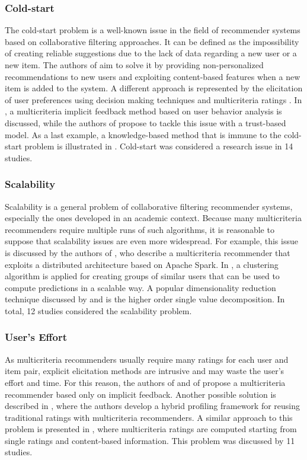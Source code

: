 \subsubsection{Cold-start}
The cold-start problem is a well-known issue in the field of recommender systems based on collaborative filtering approaches. It can be defined as the impossibility of creating reliable suggestions due to the lack of data regarding a new user or a new item. The authors of  aim to solve it by providing non-personalized recommendations to new users and exploiting content-based features when a new item is added to the system. A different approach is represented by the elicitation of user preferences using decision making techniques and multicriteria ratings . In , a multicriteria implicit feedback method based on user behavior analysis is discussed, while the authors of  propose to tackle this issue with a trust-based model. As a last example, a knowledge-based method that is immune to the cold-start problem is illustrated in . Cold-start was considered a research issue in 14 studies.  

\subsubsection{Scalability}
Scalability is a general problem of collaborative filtering recommender systems, especially the ones developed in an academic context. Because many multicriteria recommenders require multiple runs of such algorithms, it is reasonable to suppose that scalability issues are even more widespread. For example, this issue is discussed by the authors of , who describe a multicriteria recommender that exploits a distributed architecture based on Apache Spark. In , a clustering algorithm is applied for creating groups of similar users that can be used to compute predictions in a scalable way. A popular dimensionality reduction technique discussed by  and  is the higher order single value decomposition. In total, 12 studies considered the scalability problem.

\subsubsection{User's Effort}
As multicriteria recommenders usually require many ratings for each user and item pair, explicit elicitation methods are intrusive and may waste the user's effort and time. For this reason, the authors of  and of  propose a multicriteria recommender based only on implicit feedback. Another possible solution is described in , where the authors develop a hybrid profiling framework for reusing traditional ratings with multicriteria recommenders. A similar approach to this problem is presented in , where multicriteria ratings are computed starting from single ratings and content-based information. This problem was discussed by 11 studies. 

